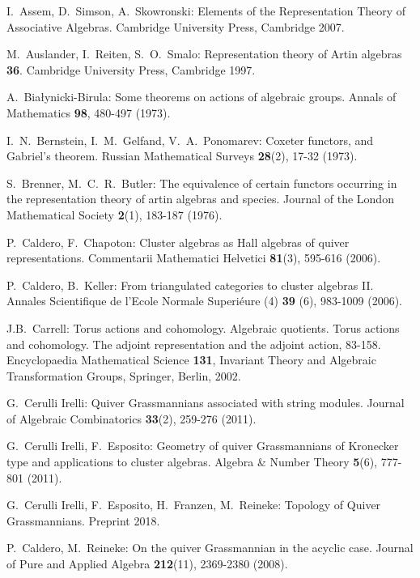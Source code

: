 \documentclass[smallextended,envcountsect,envcountsame]{svjour3}
\numberwithin{equation}{section}
\begin{document}
\begin{thebibliography}{10}

  I.~Assem, D.~Simson, A.~Skowronski: Elements of the Representation Theory of Associative Algebras. Cambridge University Press, Cambridge 2007.

  M.~Auslander, I.~Reiten, S.~O.~Smalo: Representation theory of Artin algebras {\bf 36}. Cambridge University Press, Cambridge 1997.

  A.~Bia\l{}ynicki-Birula: Some theorems on actions of algebraic groups. Annals of Mathematics \textbf{98}, 480-497 (1973).

  I.~N.~Bernstein, I.~M.~Gelfand, V.~A.~Ponomarev: Coxeter functors, and Gabriel's theorem. Russian Mathematical Surveys \textbf{28}(2), 17-32 (1973).

  S.~Brenner, M.~C.~R.~Butler: The equivalence of certain functors occurring in the representation theory of artin algebras and species. Journal of the London Mathematical Society \textbf{2}(1), 183-187 (1976).

  P.~Caldero, F.~Chapoton: Cluster algebras as {H}all algebras of quiver representations. Commentarii Mathematici Helvetici \textbf{81}(3), 595-616 (2006).

  P.~Caldero, B.~Keller: From triangulated categories to cluster algebras II.  Annales Scientifique de l'Ecole Normale Superi\'{e}ure (4) \textbf{39} (6), 983-1009 (2006).

	J.B.~Carrell: Torus actions and cohomology. Algebraic quotients. Torus actions and cohomology. The adjoint representation and the adjoint action, 83-158. Encyclopaedia Mathematical Science \textbf{131}, Invariant Theory and Algebraic Transformation Groups, Springer, Berlin, 2002.

 G.~Cerulli Irelli: Quiver Grassmannians associated with string modules. Journal of Algebraic Combinatorics \textbf{33}(2), 259-276 (2011).

  G.~Cerulli Irelli, F.~Esposito: Geometry of quiver Grassmannians of Kronecker type and applications to cluster algebras. Algebra \&  Number Theory \textbf{5}(6), 777-801 (2011).

  G.~Cerulli Irelli, F.~Esposito, H.~Franzen, M.~Reineke: Topology of Quiver Grassmannians. Preprint 2018.

  P.~Caldero, M.~Reineke: On the quiver Grassmannian in the acyclic case. Journal of Pure and Applied Algebra \textbf{212}(11), 2369-2380 (2008).


\end{thebibliography}
\end{document}
